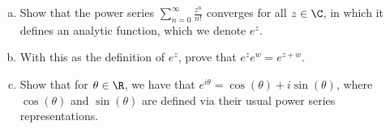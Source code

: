 \documentclass[10pt]{mypackage}
\begin{document}
\RaggedRight
\begin{problem}[Problem 1]\hfill
  \begin{enumerate}[(a)]
    \item Show that the power series $\sum_{n=0}^{\infty}\frac{z^{n}}{n!}$ converges for all $z\in \C$, in which it defines an analytic function, which we denote $e^{z}$.
    \item With this as the definition of $e^{z}$, prove that $e^{z}e^{w} = e^{z+w}$.
    \item Show that for $\theta\in \R$, we have that $e^{i\theta} = \cos\left( \theta \right) + i\sin\left( \theta \right)$, where $\cos\left( \theta \right)$ and $\sin\left( \theta \right)$ are defined via their usual power series representations.
  \end{enumerate}
\end{problem}
\end{document}
